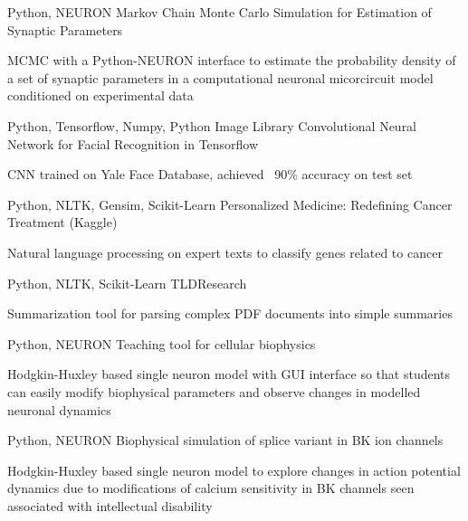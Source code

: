 \begin{cventries}
\cventry
{Python, NEURON} %
{Markov Chain Monte Carlo Simulation for Estimation of Synaptic Parameters} %
{} %
{} %
{ %
\begin{cvitems}
\item {MCMC with a Python-NEURON interface to estimate the probability density of a set of synaptic parameters in a computational neuronal micorcircuit model conditioned on experimental data}
\end{cvitems}
}
\cventry
{Python, Tensorflow, Numpy, Python Image Library} %
{Convolutional Neural Network for Facial Recognition in Tensorflow} %
{} %
{} %
{ %
\begin{cvitems}
\item {CNN trained on Yale Face Database, achieved ~90\% accuracy on test set}
\end{cvitems}
}
\cventry
{Python, NLTK, Gensim, Scikit-Learn} %
{Personalized Medicine: Redefining Cancer Treatment (Kaggle)} %
{} %
{} %
{ %
\begin{cvitems}
\item {Natural language processing on expert texts to classify genes related to cancer}
\end{cvitems}
}
\cventry
{Python, NLTK, Scikit-Learn} %
{TLDResearch} %
{} %
{} %
{ %
\begin{cvitems}
\item {Summarization tool for parsing complex PDF documents into simple summaries}
\end{cvitems}
}
\cventry
{Python, NEURON} %
{Teaching tool for cellular biophysics} %
{} %
{} %
{ %
\begin{cvitems}
\item {Hodgkin-Huxley based single neuron model with GUI interface so that students can easily modify biophysical parameters and observe changes in modelled neuronal dynamics}
\end{cvitems}
}
\cventry
{Python, NEURON} %
{Biophysical simulation of splice variant in BK ion channels} %
{} %
{} %
{ %
\begin{cvitems}
\item {Hodgkin-Huxley based single neuron model to explore changes in action potential dynamics due to modifications of calcium sensitivity in BK channels seen associated with intellectual disability}
\end{cvitems}
}


\end{cventries}
